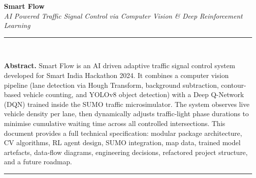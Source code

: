 \documentclass[10pt, a4paper]{article}
\begin{document}

\begin{center}
  {\Huge\bfseries\color{monodark} Smart Flow}\\[5pt]
  {\large\itshape\color{monomedium}
    AI Powered Traffic Signal Control via Computer Vision \& Deep Reinforcement Learning
  }\\[9pt]
  \noindent\rule{\linewidth}{0.4pt}\\[6pt]
\end{center}

\noindent\textbf{Abstract.}\quad
Smart Flow is an AI driven adaptive traffic signal control system developed for
Smart India Hackathon 2024. It combines a computer vision pipeline (lane
detection via Hough Transform, background subtraction, contour-based vehicle
counting, and YOLOv8 object detection) with a Deep Q-Network (DQN) trained
inside the SUMO traffic microsimulator. The system observes live vehicle
density per lane, then dynamically adjusts traffic-light phase durations to
minimise cumulative waiting time across all controlled intersections. This
document provides a full technical specification: modular package architecture, CV
algorithms, RL agent design, SUMO integration, map data, trained model
artefacts, data-flow diagrams, engineering decisions, refactored project structure,
and a future roadmap.

\vspace{6pt}
\noindent\rule{\linewidth}{0.4pt}
\vspace{4pt}
\end{document}
